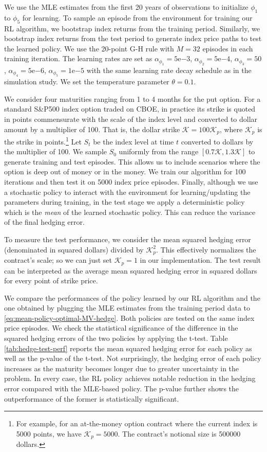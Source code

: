 \documentclass[11pt]{article}
\newcommand{\1}{\mathbbm{1}}
\begin{document}
We use the MLE estimates from the first 20 years of observations to initialize $\phi_1$ to $\phi_5$ for learning. To sample an episode from the environment for training our RL algorithm, we bootstrap index returns from the training period. Similarly, we bootstrap index returns from the test period to generate index price paths to test the learned policy. We use the 20-point G-H rule with $M=32$ episodes in each training iteration. The learning rates are set as
$\alpha_{\phi_1}=5\mathrm{e}{-3}$, $\alpha_{\phi_2}=5\mathrm{e}{-4}$, $\alpha_{\phi_3}=50$, $\alpha_{\phi_4}=5\mathrm{e}{-6}$, $\alpha_{\phi_5}=1\mathrm{e}{-5}$ with the same learning rate decay schedule as in the simulation study. We set the temperature parameter $\theta=0.1$.

We consider four maturities ranging from 1 to 4 months for the put option. For a standard S\&P500 index option traded on CBOE, in practice its strike is quoted in points commensurate with the scale of the index level and converted to dollar amount by a multiplier of 100. That is, the dollar strike $\mathcal{K}=100\mathcal{K}_p$, where $\mathcal{K}_p$ is the strike in points.\footnote{For example, for an at-the-money option contract where the current index is 5000 points, we have $\mathcal{K}_p=5000$. The contract's notional size is 500000 dollars.} Let $S_t$ be the index level at time $t$ converted to dollars by the multiplier of 100. We sample $S_0$ uniformly from the range $[0.7\mathcal{K}, 1.3\mathcal{K}]$ to generate training and test episodes. This allows us to include scenarios where the option is deep out of money or in the money. We train our algorithm for 100 iterations and then test it on 5000 index price episodes. Finally, although we use a stochastic policy to interact with the environment for learning/updating the parameters during training, in the test stage we apply a deterministic policy which is the \emph{mean} of the learned stochastic policy. This can reduce the variance of the final hedging error.

To measure the test performance, we consider the mean squared hedging error (denominated in squared dollars) divided by $\mathcal{K}_p^2$. This effectively normalizes the contract's scale; so we can just set $\mathcal{K}_p=1$ in our implementation. The test result can be interpreted as the average mean squared hedging error in squared
 dollars for every point of strike price.

We compare the performances of the policy learned by our RL algorithm and the one obtained by plugging the MLE estimates from the training period data to \eqref{eq:mean-policy-optimal-MV-hedge}. Both policies are tested on the same index price episodes. We check the statistical significance of the difference in the squared hedging errors of the two policies by applying the t-test. Table \ref{tab:hedge-test-perf} reports the mean squared hedging error for each policy as well as the p-value of the t-test. Not surprisingly, the hedging error of each policy increases as the maturity becomes longer due to greater uncertainty in the problem. In every case, the RL policy achieves notable reduction in the hedging error compared with the MLE-based policy. The p-value further shows the outperformance of the former is statistically significant.
\end{document}
